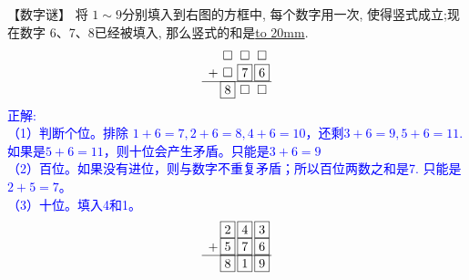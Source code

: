 \item {
    【数字谜】
    将 $1\sim 9$分别填入到右图的方框中, 每个数字用一次, 使得竖式成立;现在数字 6、7、8已经被填入, 那么竖式的和是\underline{\hbox to 20mm{}}.
    \[
    \begin{array}{l@{\,} c@{\,} c@{\,} c@{\,}}
    & \square & \square & \square \\
    + & \square  & \boxed{7} & \boxed{6} \\
    \cline{1-4}
    & \boxed{8} & \square & \square \\
    \end{array}
    \]
    \ifshowSolution 
        \fangsong{}\textcolor{blue}{
            正解: \\
            （1）判断个位。排除 $1+6=7,2+6=8,4+6=10$，还剩$3+6=9,5+6=11$. 如果是$5+6=11$，则十位会产生矛盾。只能是$3+6=9$ \\
            （2）百位。如果没有进位，则与数字不重复矛盾；所以百位两数之和是7. 只能是$2+5=7$。\\
            （3）十位。填入4和1。\\
            \[
            \begin{array}{l@{\,} c@{\,} c@{\,} c@{\,}}
            & \boxed{2} & \boxed{4} & \boxed{3} \\
            + & \boxed{5}  & \boxed{7} & \boxed{6} \\
            \cline{1-4}
            & \boxed{8} & \boxed{1} & \boxed{9} \\
            \end{array}
            \]
        }
    \else
        \vspace{1cm}
    \fi
}

